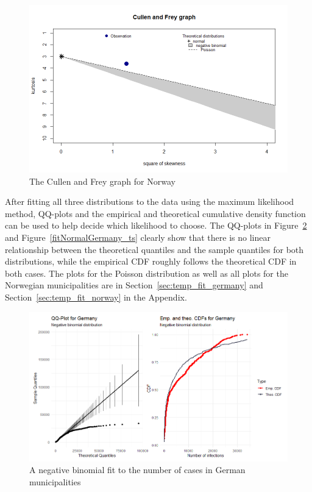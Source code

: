 \begin{figure}[H]
  \centering
  \includegraphics[width = \textwidth]{cf_norway_ts.png}
  \caption{The Cullen and Frey graph for Norway}
  \label{cf_norway_ts}
\end{figure}
After fitting all three distributions to the data using the maximum likelihood method, QQ-plots and the empirical and theoretical cumulative density function can be used to help decide which likelihood to choose. The QQ-plots in Figure~\ref{fitNegbinomGermany_ts} and Figure~\ref{fitNormalGermany_ts} clearly show that there is no linear relationship between the theoretical quantiles and the sample quantiles for both distributions, while the empirical CDF roughly follows the theoretical CDF in both cases. The plots for the Poisson distribution as well as all plots for the Norwegian municipalities are in Section~\ref{sec:temp_fit_germany} and Section~\ref{sec:temp_fit_norway} in the Appendix. \clearpage
\begin{figure}[H]
  \centering
  \includegraphics[width = \textwidth]{fit_nbinom_germany_ts.png}
  \caption{A negative binomial fit to the number of cases in German municipalities}
  \label{fitNegbinomGermany_ts}
\end{figure}
